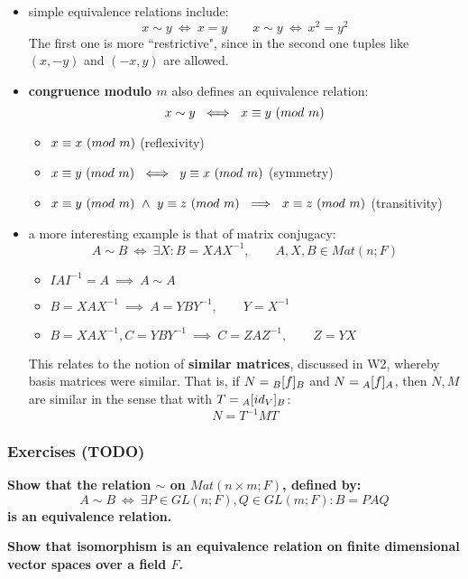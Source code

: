 \documentclass{exam}
\begin{document}
\begin{itemize}
    \item simple equivalence relations include:
    \[
    x \sim y \ \iff \ x = y \qquad x \sim y \ \iff \ x^2 = y^2
    \]
    The first one is more ``restrictive", since in the second one tuples like $(x,-y)$ and $(-x,y)$ are allowed.
    \item \textbf{congruence modulo $m$} also defines an equivalence relation:
    \[
    x \sim y \ \iff \ \modulom{x}{y}
    \]
    \begin{itemize}
        \item $\modulom{x}{x}$ (reflexivity)
        \item $\modulom{x}{y} \ \iff \ \modulom{y}{x}$ (symmetry)
        \item $\modulom{x}{y} \ \wedge \ \modulom{y}{z} \ \implies \ \modulom{x}{z}$ (transitivity)
    \end{itemize}
    \item a more interesting example is that of matrix conjugacy:
    \[
    A \sim B \ \iff \ \exists X : B = XAX^{-1}, \qquad A,X,B \in Mat(n;F)
    \]
    \begin{itemize}
        \item $IAI^{-1} = A \ \implies \ A \sim A$
        \item $B = XAX^{-1} \ \implies \ A = YBY^{-1}, \qquad Y = X^{-1}$
        \item $B = XAX^{-1}, C = YBY^{-1} \ \implies \ C = ZAZ^{-1}, \qquad Z = YX$
    \end{itemize}
    This relates to the notion of \textbf{similar matrices}, discussed in W2, whereby basis matrices were similar. That is, if $N = \cript{f}{B}{B}$ and $N = \cript{f}{A}{A}$, then $N,M$ are similar in the sense that with $T = \cript{id_V}{A}{B}$:
    \[
    N = T^{-1}MT
    \]
\end{itemize}

\subsubsection{Exercises (TODO)}

\begin{questions}

\question \textbf{Show that the relation $\sim$ on $Mat(n \times m; F)$, defined by:
\[
A \sim B \ \iff \ \exists P \in GL(n;F), Q \in GL(m;F) : B = PAQ 
\]
is an equivalence relation.}

\question \textbf{Show that isomorphism is an equivalence relation on finite dimensional vector spaces over a field $F$.}

\end{questions}
\end{document}
